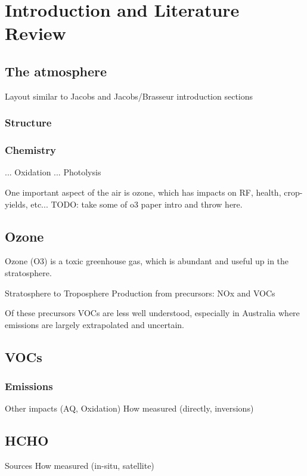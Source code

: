 \chapter{Introduction and Literature Review} %
\label{LR}

\section{The atmosphere}
\label{LR:Atmos}
  Layout similar to Jacobs and Jacobs/Brasseur introduction sections
  

  
  \subsection{Structure}
  \label{LR:Atmos:Struct}
  
  \subsection{Chemistry}
  \label{LR:Atmos:Chem}
  ...
  Oxidation
  ...
  Photolysis
  
  One important aspect of the air is ozone, which has impacts on RF, health, crop-yields, etc...
  TODO: take some of o3 paper intro and throw here.
\section{Ozone}
\label{LR:O3}
  Ozone (O3) is a toxic greenhouse gas, which is abundant and useful up in the stratosphere.
  
  
    Stratosphere to Troposphere
    Production from precursors: NOx and VOCs
    
    Of these precursors VOCs are less well understood, especially in Australia where emissions are largely extrapolated and uncertain.

\section{VOCs}
\label{LR:VOCs}
    
    \subsection{Emissions}
    Other impacts (AQ, Oxidation)
    How measured (directly, inversions)
    
\section{HCHO}
\label{LR:HCHO}
    Sources
    How measured (in-situ, satellite)

